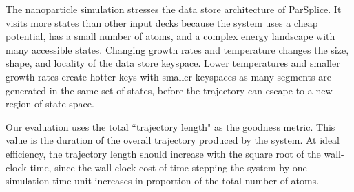 The nanoparticle simulation stresses the data store architecture of ParSplice. It
visits more states than other input decks because the system uses a cheap
potential, has a small number of atoms, and a complex energy landscape with
many accessible states. Changing growth rates and temperature changes the
size, shape, and locality of the data store keyspace. Lower temperatures and
smaller growth rates create hotter keys with smaller keyspaces as many segments
are generated in the same set of states, before the trajectory can escape to a
new region of state space.

Our evaluation uses the total ``trajectory length" as the goodness metric. This
value is the duration of the overall trajectory produced by the system. At
ideal efficiency, the trajectory length should increase with the square root of
the wall-clock time, since the wall-clock cost of time-stepping the system by
one simulation time unit increases in proportion of the total number of atoms.
